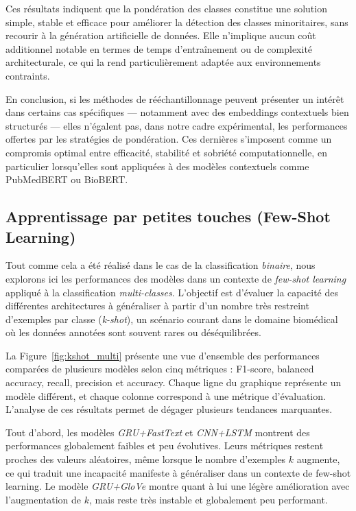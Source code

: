 \documentclass[12pt]{report}
\begin{document}
Ces résultats indiquent que la pondération des classes constitue une solution simple, stable et efficace pour améliorer la détection des classes minoritaires, sans recourir à la génération artificielle de données. Elle n’implique aucun coût additionnel notable en termes de temps d’entraînement ou de complexité architecturale, ce qui la rend particulièrement adaptée aux environnements contraints.

En conclusion, si les méthodes de rééchantillonnage peuvent présenter un intérêt dans certains cas spécifiques — notamment avec des embeddings contextuels bien structurés — elles n’égalent pas, dans notre cadre expérimental, les performances offertes par les stratégies de pondération. Ces dernières s’imposent comme un compromis optimal entre efficacité, stabilité et sobriété computationnelle, en particulier lorsqu’elles sont appliquées à des modèles contextuels comme PubMedBERT ou BioBERT.

\subsection{Apprentissage par petites touches (Few-Shot Learning)}

Tout comme cela a été réalisé dans le cas de la classification \textit{binaire}, nous explorons ici les performances des modèles dans un contexte de \textit{few-shot learning} appliqué à la classification \textit{multi-classes}. L'objectif est d'évaluer la capacité des différentes architectures à généraliser à partir d’un nombre très restreint d’exemples par classe (\textit{k-shot}), un scénario courant dans le domaine biomédical où les données annotées sont souvent rares ou déséquilibrées.

La Figure~\ref{fig:kshot_multi} présente une vue d’ensemble des performances comparées de plusieurs modèles selon cinq métriques : F1-score, balanced accuracy, recall, precision et accuracy. Chaque ligne du graphique représente un modèle différent, et chaque colonne correspond à une métrique d’évaluation. L’analyse de ces résultats permet de dégager plusieurs tendances marquantes.

Tout d’abord, les modèles \textit{GRU+FastText} et \textit{CNN+LSTM} montrent des performances globalement faibles et peu évolutives. Leurs métriques restent proches des valeurs aléatoires, même lorsque le nombre d’exemples $k$ augmente, ce qui traduit une incapacité manifeste à généraliser dans un contexte de few-shot learning. Le modèle \textit{GRU+GloVe} montre quant à lui une légère amélioration avec l’augmentation de $k$, mais reste très instable et globalement peu performant.
\end{document}
